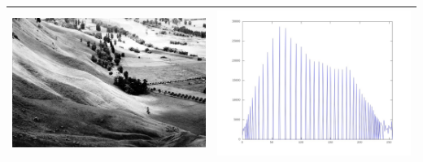 \documentclass[brazil,times]{abnt}
\begin{document}
\begin{table}[ht]
\begin{tabular}{|c|c|}
			\includegraphics[scale=0.125]{imagens/hawkes-contrast.jpg}&\includegraphics[scale=0.15]{imagens/hawkes-hist-novo.jpg}\\
			\hline
			\end{tabular}
			\label{tab:gt}
			\end{table}
\end{document}
